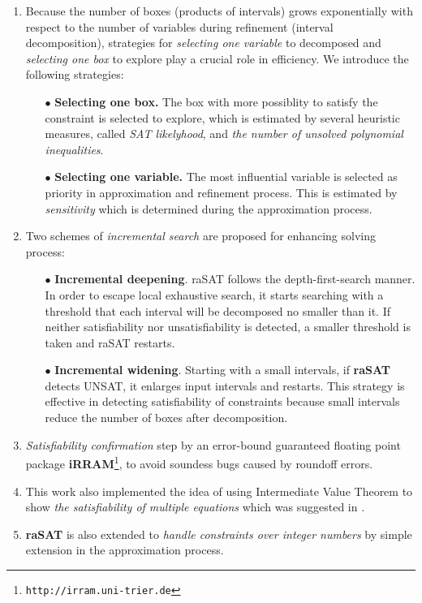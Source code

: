 \begin{enumerate}
\item Because the number of boxes (products of intervals) grows exponentially with respect to the number of variables during refinement (interval decomposition), strategies for \emph{selecting one variable} to decomposed and \emph{selecting one box} to explore play a crucial role in efficiency. We introduce the following strategies:
\begin{itemize}
\item[$\bullet$] \textbf{Selecting one box.} The box with more possiblity to satisfy the constraint is selected to explore, which is estimated by 
several heuristic measures, called {\em SAT likelyhood}, 
and \emph{the number of unsolved polynomial inequalities}.
\item[$\bullet$] \textbf{Selecting one variable.} The most influential variable is selected as priority in approximation and refinement process. 
This is estimated by {\em sensitivity} which is determined during the approximation process.
\end{itemize}
\item Two schemes of \emph{incremental search} are proposed for enhancing solving process: 
\begin{itemize} 
\item[$\bullet$] {\bf Incremental deepening}. 
raSAT follows the depth-first-search manner. In order to escape local exhaustive search, it starts searching with a threshold that each interval will be decomposed no smaller than it. 
If neither satisfiability nor unsatisfiability is detected, a smaller threshold is taken and raSAT restarts. 
\item[$\bullet$] {\bf Incremental widening}. 
Starting with a small intervals, if \textbf{raSAT} detects UNSAT, it enlarges input intervals and restarts. This strategy is effective in detecting satisfiability of constraints because small intervals reduce the number of boxes after decomposition.
\end{itemize} 
\begin{comment}
SAT-likelihood is introduced to measure the possibility of an inequality to be satisfiable. Sensitivity is proposed to estimate the influence of a variable to the value of a polynomial.
\end{comment}
\item \emph{Satisfiability confirmation} step by an error-bound guaranteed floating point package {\bf iRRAM}\footnote{%
\tt http://irram.uni-trier.de}, to avoid soundess bugs caused by roundoff errors.
\item This work also implemented the idea of using Intermediate Value Theorem to show \emph{the satisfiability of multiple equations} which was suggested in \cite{VanKhanh201227}.
\item \textbf{raSAT} is also extended to \emph{handle constraints over integer numbers} by simple extension in the approximation process.
\end{enumerate}